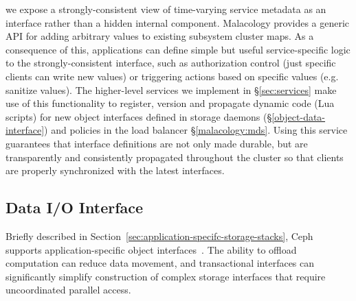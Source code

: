  we expose a strongly-consistent
view of time-varying service metadata as an interface rather than a hidden
internal component. Malacology provides a generic API for adding arbitrary
values to existing subsystem cluster maps. As a consequence of this,
applications can define simple but useful service-specific logic to the
strongly-consistent interface, such as authorization control (just specific
clients can write new values) or triggering actions based on specific values
(e.g. sanitize values).  The higher-level services we implement in
\S\ref{sec:services} make use of this functionality to register, version and
propagate dynamic code (Lua scripts) for new object interfaces defined in
storage daemons (\S\ref{object-data-interface}) and policies in the load
balancer \S\ref{malacology:mds}.  Using this service guarantees that interface
definitions are not only made durable, but are transparently and consistently
propagated throughout the cluster so that clients are properly synchronized
with the latest interfaces.\\

\noindent{} 


\subsection{Data I/O Interface}
\label{sec:data-io-interface}
\label{object-data-interface}

Briefly described in Section~\ref{sec:application-specifc-storage-stacks}, Ceph
supports application-specific object interfaces~\cite{weil_rados_2007}. The
ability to offload computation can reduce data movement, and transactional
interfaces can significantly simplify construction of complex storage
interfaces that require uncoordinated parallel access.

